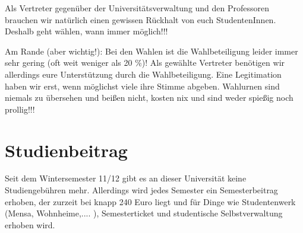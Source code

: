 Als Vertreter gegenüber der Universitätsverwaltung und den Professoren brauchen wir natürlich einen gewissen Rückhalt von euch StudentenInnen. Deshalb geht wählen, wann immer möglich!!!

Am Rande (aber wichtig!): Bei den Wahlen ist die Wahlbeteiligung leider immer sehr gering (oft weit weniger als 20 \%)! Als gewählte Vertreter benötigen wir allerdings eure Unterstützung durch die Wahlbeteiligung. Eine Legitimation haben wir erst, wenn möglichst viele ihre Stimme abgeben. Wahlurnen sind niemals zu übersehen und beißen nicht, kosten nix und sind weder spießig noch prollig!!!

\section*{Studienbeitrag}
Seit dem Wintersemester 11/12 gibt es an dieser Universität keine Studiengebühren mehr.
Allerdings wird jedes Semester ein Semesterbeitrag erhoben, der zurzeit bei knapp 240 Euro liegt und für Dinge wie Studentenwerk (Mensa, Wohnheime,.... ), Semesterticket und studentische Selbstverwaltung erhoben wird.
